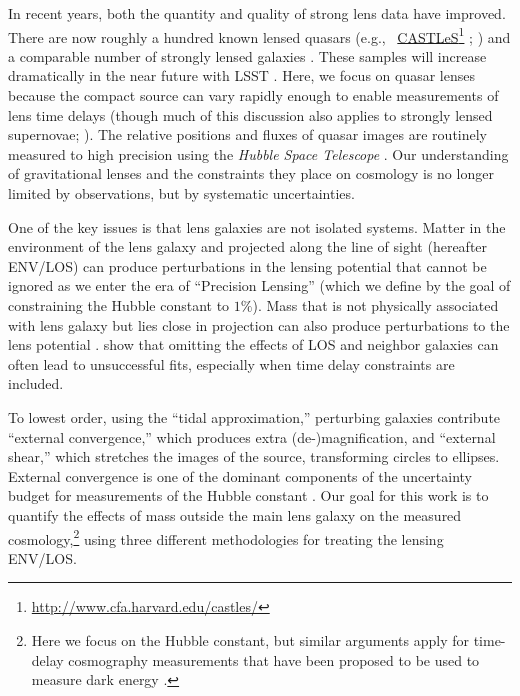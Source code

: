 \documentclass{emulateapj}
\newcommand\fnurl[2]{%
\href{#2}{#1}\footnote{\url{#2}}%
}
\begin{document}
In recent years, both the quantity and quality of strong lens data have improved. There are now roughly a hundred known lensed quasars (e.g.,\ \fnurl{CASTLeS}{http://www.cfa.harvard.edu/castles/}; \citealt{SQLS,CLASS}) and a comparable number of strongly lensed galaxies \citep[e.g.,][]{Bolton08,Cassowary}. These samples will increase dramatically in the near future with LSST \citep[e.g.,][]{LSST, Coe09, Oguri10, Collett15}. Here, we focus on quasar lenses because the compact source can vary rapidly enough to enable measurements of lens time delays (though much of this discussion also applies to strongly lensed supernovae; \citealt{Kelly15}). The relative positions and fluxes of quasar images are routinely measured to high precision using the \textit{Hubble Space Telescope} \citep[e.g,.][and references therein; CASTLeS Collaboration]{Lehar00,Sluse12}. Our understanding of gravitational lenses and the constraints they place on cosmology is no longer limited by observations, but by systematic uncertainties. 

One of the key issues is that lens galaxies are not isolated systems. Matter in the environment of the lens galaxy and projected along the line of sight (hereafter ENV/LOS) can produce perturbations in the lensing potential that cannot be ignored as we enter the era of ``Precision Lensing'' (which we define by the goal of constraining the Hubble constant to $1\%$). Mass that is not physically associated with lens galaxy but lies close in projection can also produce perturbations to the lens potential \citep[e.g.,][]{Bar-Kana96,Momcheva06,Wong11}. \citet{Jaroszynski14} show that omitting the effects of LOS and neighbor galaxies can often lead to unsuccessful fits, especially when time delay constraints are included.

To lowest order, using the ``tidal approximation,'' perturbing galaxies contribute ``external convergence,'' which produces extra (de-)magnification, and ``external shear,'' which stretches the images of the source, transforming circles to ellipses. External convergence is one of the dominant components of the uncertainty budget for measurements of the Hubble constant \citep{Suyu12}. Our goal for this work is to quantify the effects of mass outside the main lens galaxy on the measured cosmology,\footnote{Here we focus on the Hubble constant, but similar arguments apply for time-delay cosmography measurements that have been proposed to be used to measure dark energy \citep{Treu13}.} using three different methodologies for treating the lensing ENV/LOS.
\end{document}
